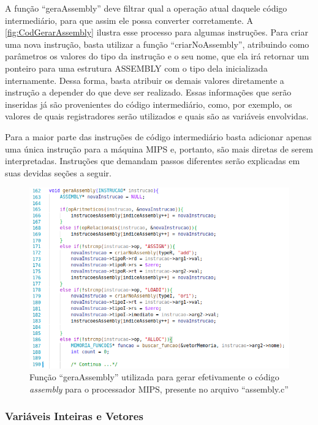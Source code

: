 \documentclass[
	12pt,				%
	oneside,
	a4paper,			%
	english,			%
	french,				%
	spanish,			%
	brazil,				%
	]{abntex2}
\begin{document}
A função ``geraAssembly'' deve filtrar qual a operação atual daquele código intermediário, para que assim ele possa converter corretamente. A \autoref{fig:CodGerarAssembly} ilustra esse processo para algumas instruções. Para criar uma nova instrução, basta utilizar a função ``criarNoAssembly'', atribuindo como parâmetros os valores do tipo da instrução e o seu nome, que ela irá retornar um ponteiro para uma estrutura ASSEMBLY com o tipo dela inicializada internamente. Dessa forma, basta atribuir os demais valores diretamente a instrução a depender do que deve ser realizado. Essas informações que serão inseridas já são provenientes do código intermediário, como, por exemplo, os valores de quais registradores serão utilizados e quais são as variáveis envolvidas. 

Para a maior parte das instruções de código intermediário basta adicionar apenas uma única instrução para a máquina MIPS e, portanto, são mais diretas de serem interpretadas. Instruções que demandam passos diferentes serão explicadas em suas devidas seções a seguir. 

\begin{figure}[H]
\centering 
\caption{Função ``geraAssembly'' utilizada para gerar efetivamente o código \emph{assembly} para o processador MIPS, presente no arquivo \nohyphens{``assembly.c''}} 
\label{fig:CodGerarAssembly}
\graphicspath{ {./imgs/} } 
\includegraphics[scale=0.6]{imgs/Codigo/Cod_GeraAssembly.png}
\end{figure}

\subsubsection{Variáveis Inteiras e Vetores}
\end{document}
